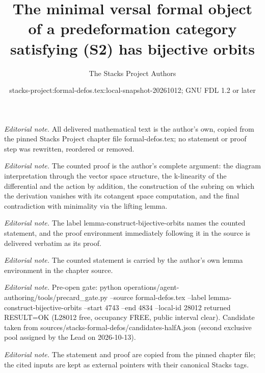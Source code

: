 \documentclass[10pt,a4paper]{amsart}
\title{The minimal versal formal object of a predeformation category satisfying (S2) has bijective orbits}
\author{The Stacks Project Authors}
\date{stacks-project:formal-defos.tex:local-snapshot-20261012; GNU FDL 1.2 or later}
\theoremstyle{plain}
\theoremstyle{definition}
\theoremstyle{remark}
\numberwithin{equation}{subsection}
\begin{document}
\maketitle
\noindent\textit{Editorial note.} All delivered mathematical text is the author's own, copied from the pinned Stacks Project chapter file formal-defos.tex; no statement or proof step was rewritten, reordered or removed.\par\medskip
\noindent\textit{Editorial note.} The counted proof is the author's complete argument: the diagram interpretation through the vector space structure, the k-linearity of the differential and the action by addition, the construction of the subring on which the derivation vanishes with its cotangent space computation, and the final contradiction with minimality via the lifting lemma.\par\medskip
\noindent\textit{Editorial note.} The label lemma-construct-bijective-orbits names the counted statement, and the proof environment immediately following it in the source is delivered verbatim as its proof.\par\medskip
\noindent\textit{Editorial note.} The counted statement is carried by the author's own lemma environment in the chapter source.\par\medskip
\noindent\textit{Editorial note.} Pre-open gate: python operations/agent-authoring/tools/precard\_gate.py --source formal-defos.tex --label lemma-construct-bijective-orbits --start 4743 --end 4834 --local-id 28012 returned RESULT=OK (L28012 free, occupancy FREE, public interval clear). Candidate taken from sources/stacks-formal-defos/candidates-halfA.json (second exclusive pool assigned by the Lead on 2026-10-13).\par\medskip
\noindent\textit{Editorial note.} The statement and proof are copied from the pinned chapter file; the cited inputs are kept as external pointers with their canonical Stacks tags.\par\medskip
\end{document}
